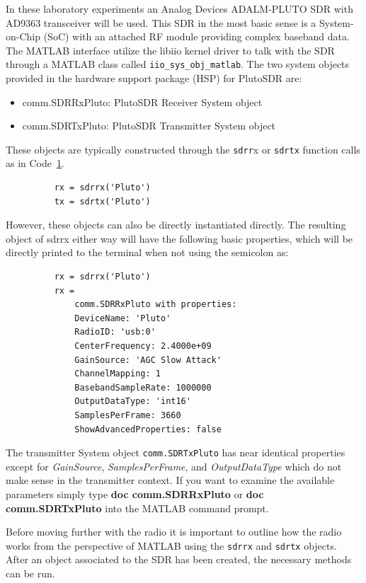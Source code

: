 \documentclass[letterpaper,12pt]{article}
\begin{document}
In these laboratory experiments an Analog Devices ADALM-PLUTO SDR with AD9363 transceiver will be used. This SDR in the most basic sense is a System-on-Chip (SoC) with an attached RF module providing complex baseband data. The MATLAB interface utilize the libiio kernel driver to talk with the SDR through a MATLAB class called \texttt{iio\_sys\_obj\_matlab}. The two system objects provided in the hardware support package (HSP) for PlutoSDR
are:
\begin{itemize}
\item comm.SDRRxPluto: PlutoSDR Receiver System object
\item comm.SDRTxPluto: PlutoSDR Transmitter System object
\end{itemize}
These objects are typically constructed through the \texttt{sdrr}x or \texttt{sdrtx} function calls as in Code~\ref{codepluto}.


%
\begin{figure}[!htp]
    \centering
\begin{minipage}{0.5\linewidth}
\begin{lstlisting}
    rx = sdrrx('Pluto')
	tx = sdrtx('Pluto')
\end{lstlisting}
\end{minipage}
\label{codepluto}
\end{figure}

However, these objects can also be directly instantiated directly. The resulting object of sdrrx either
way will have the following basic properties, which will be directly printed to the terminal when not
using the semicolon as:

\begin{figure}[!htp]
    \centering
\begin{minipage}{0.5\linewidth}
\begin{lstlisting}
	rx = sdrrx('Pluto')
	rx =
		comm.SDRRxPluto with properties:
		DeviceName: 'Pluto'
		RadioID: 'usb:0'
		CenterFrequency: 2.4000e+09
		GainSource: 'AGC Slow Attack'
		ChannelMapping: 1
		BasebandSampleRate: 1000000
		OutputDataType: 'int16'
		SamplesPerFrame: 3660
		ShowAdvancedProperties: false
\end{lstlisting}
\end{minipage}
\label{codepluto2}
\end{figure}

The transmitter System object \texttt{comm.SDRTxPluto} has near identical properties except for \textit{GainSource}, \textit{SamplesPerFrame}, and \textit{OutputDataType} which do not make sense in the transmitter context. If you want to examine the available parameters simply type \textbf{doc comm.SDRRxPluto} or \textbf{doc comm.SDRTxPluto} into the MATLAB command prompt.\par
%
Before moving further with the radio it is important to outline how the radio works from the perspective of MATLAB using the \texttt{sdrrx} and \texttt{sdrtx} objects. After an object associated to the SDR has been created, the necessary methods can be run.  
\end{document}
